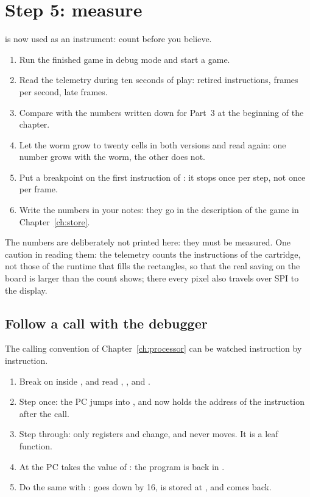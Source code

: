 \section{Step 5: measure}

\prgqt is now used as an instrument: count before you believe.

\begin{prgtry}
\begin{enumerate}[nosep]
\item Run the finished game in debug mode and start a game.
\item Read the telemetry during ten seconds of play: retired instructions,
  frames per second, late frames.
\item Compare with the numbers written down for Part~3 at the beginning of the
  chapter.
\item Let the worm grow to twenty cells in both versions and read again: one
  number grows with the worm, the other does not.
\item Put a breakpoint on the first instruction of : it
  stops once per step, not once per frame.
\item Write the numbers in your notes: they go in the description of the game
  in Chapter~\ref{ch:store}.
\end{enumerate}
\end{prgtry}

The numbers are deliberately not printed here: they must be measured. One
caution in reading them: the telemetry counts the instructions of the
cartridge, not those of the runtime that fills the rectangles, so that the
real saving on the board is larger than the count shows; there every pixel
also travels over SPI to the display.

\subsection{Follow a call with the debugger}

The calling convention of Chapter~\ref{ch:processor} can be watched
instruction by instruction.

\begin{enumerate}
\item Break on  inside , and read
  , ,  and .
\item Step once: the PC jumps into , and  now holds
  the address of the instruction after the call.
\item Step through: only  registers and  change, and 
  never moves. It is a leaf function.
\item At  the PC takes the value of : the program is back in
  .
\item Do the same with :  goes down by 16,
   is stored at , and comes back.
\end{enumerate}

